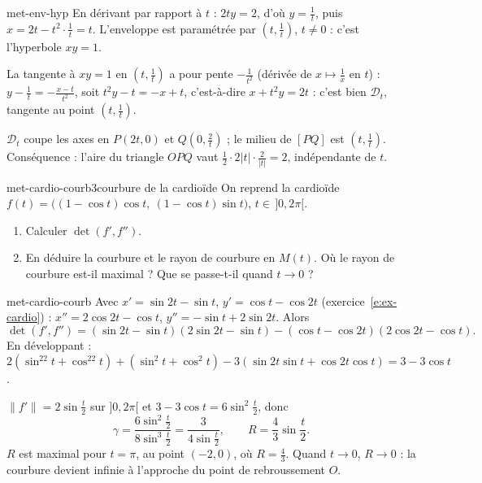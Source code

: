 \begin{corrige}{met-env-hyp}
 En dérivant par rapport à $t$ : $2ty=2$, d'où $y=\frac1t$, puis $x=2t-t^2\cdot\frac1t=t$. L'enveloppe est paramétrée par $\left(t,\frac1t\right)$, $t\neq0$ : c'est l'hyperbole $xy=1$.

 La tangente à $xy=1$ en $\left(t,\frac1t\right)$ a pour pente $-\frac1{t^2}$ (dérivée de $x\mapsto\frac1x$ en $t$) : $y-\frac1t=-\frac{x-t}{t^2}$, soit $t^2y-t=-x+t$, c'est-à-dire $x+t^2y=2t$ : c'est bien $\mathcal D_t$, tangente au point $\left(t,\frac1t\right)$.

 $\mathcal D_t$ coupe les axes en $P(2t,0)$ et $Q\left(0,\frac2t\right)$ ; le milieu de $[PQ]$ est $\left(t,\frac1t\right)$. Conséquence : l'aire du triangle $OPQ$ vaut $\frac12\cdot2|t|\cdot\frac2{|t|}=2$, indépendante de $t$.
\end{corrige}

\begin{exo}{met-cardio-courb}{3}{courbure de la cardioïde}
On reprend la cardioïde $f(t)=\big((1-\cos t)\cos t,\ (1-\cos t)\sin t\big)$, $t\in\,]0,2\pi[$.
\begin{enumerate}
\item Calculer $\det(f',f'')$.
\item En déduire la courbure et le rayon de courbure en $M(t)$. Où le rayon de courbure est-il maximal ? Que se passe-t-il quand $t\to0$ ?
\end{enumerate}
\end{exo}

\begin{corrige}{met-cardio-courb}
 Avec $x'=\sin2t-\sin t$, $y'=\cos t-\cos2t$ (exercice~\ref{e:ex-cardio}) : $x''=2\cos2t-\cos t$, $y''=-\sin t+2\sin2t$. Alors
\[\det(f',f'')=(\sin2t-\sin t)(2\sin2t-\sin t)-(\cos t-\cos2t)(2\cos2t-\cos t).\]
En développant : $2(\sin^22t+\cos^22t)+(\sin^2t+\cos^2t)-3(\sin2t\sin t+\cos2t\cos t)=3-3\cos t$.

 $\|f'\|=2\sin\frac t2$ sur $]0,2\pi[$ et $3-3\cos t=6\sin^2\frac t2$, donc
\[\gamma=\frac{6\sin^2\frac t2}{8\sin^3\frac t2}=\frac3{4\sin\frac t2},\qquad R=\frac43\sin\frac t2.\]
$R$ est maximal pour $t=\pi$, au point $(-2,0)$, où $R=\frac43$. Quand $t\to0$, $R\to0$ : la courbure devient infinie à l'approche du point de rebroussement $O$.
\end{corrige}

